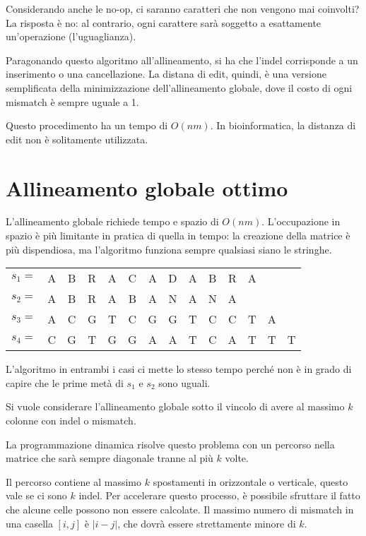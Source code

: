 Considerando anche le no-op, ci saranno caratteri che non vengono mai coinvolti? La risposta è no: al contrario, ogni carattere sarà soggetto a esattamente un'operazione (l'uguaglianza). 

Paragonando questo algoritmo all'allineamento, si ha che l'indel corrisponde a un inserimento o una cancellazione. La distana di edit, quindi, è una versione semplificata della minimizzazione dell'allineamento globale, dove il costo di ogni mismatch è sempre uguale a 1. 

Questo procedimento ha un tempo di $O(nm)$. In bioinformatica, la distanza di edit non è solitamente utilizzata.

\section{Allineamento globale ottimo}
L'allineamento globale richiede tempo e spazio di $O(nm)$. L'occupazione in spazio è più limitante in pratica di quella in tempo: la creazione della matrice è più dispendiosa, ma l'algoritmo funziona sempre qualsiasi siano le stringhe. 

\begin{example}{}{}
	\begin{tabular}{l *{13}{c}}
	$s_1 =$ & A & B & R & A & C & A & D & A & B & R & A \\
	$s_2 =$ & A & B & R & A & B & A & N & A & N & A \\
	$s_3 =$ & A & C & G & T & C & G & G & T & C & C & T & A \\
	$s_4 =$ & C & G & T & G & G & A & A & T & C & A & T & T & T
	\end{tabular}

	L'algoritmo in entrambi i casi ci mette lo stesso tempo perché non è in grado di capire che le prime metà di $s_1$ e $s_2$ sono uguali.
\end{example}

Si vuole considerare l'allineamento globale sotto il vincolo di avere al massimo $k$ colonne con indel o mismatch. 

La programmazione dinamica risolve questo problema con un percorso nella matrice che sarà sempre diagonale tranne al più $k$ volte.

Il percorso contiene al massimo $k$ spostamenti in orizzontale o verticale, questo vale se ci sono $k$ indel. Per accelerare questo processo, è possibile sfruttare il fatto che alcune celle possono non essere calcolate. Il massimo numero di mismatch in una casella $[i, j]$ è $|i-j|$, che dovrà essere strettamente minore di $k$.


